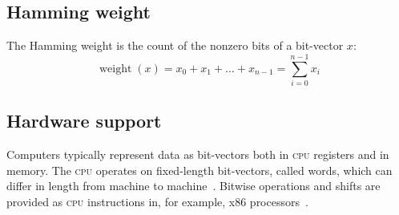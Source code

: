 \documentclass[a4paper,10pt,twoside,openright]{book}
\renewcommand{\sc}[1]{\textsc{\lowercase{#1}}}
\DeclareMathOperator{\weight}{weight}
\begin{document}
\subsection{Hamming weight}
\label{sec:hamming}
The Hamming weight is the count of the nonzero bits of a bit-vector $x$: \[\weight(x) = x_0 + x_1 + \ldots + x_{n-1} = \sum_{i=0}^{n-1}x_i\]
\iffalse
\subsection{Shifts}

For shifts and rotations, the directions \textit{left} and \textit{right} are used in relation to the bit-vector when written as a string, that is, with the least significant bit on the right and the most significant bit on the left.

The left shift operation \sc{SHL} ($\ll$) moves the bits of an $n$-bit bit-vector $x$ to the left by $k$ places, discarding the $k$ leftmost most bits and filling the first $k$ bits with zero: 
\[SHL(x, k) = \twopartdef{0}{i<k}{x_{i-k}} 0 \leq i < n\]

The right shift operation \sc{SHR} ($\gg$) moves bits of a $n$-bit bit-vector $x$ to the right by $k$ places, discarding the $k$ rightmost bits and filling the $k$ leftmost bits with zero: 
\[SHR(x, k) = \twopartdef{x_{i+k}}{i<n-k}{0} 0 \leq i < n\]

\subsection{Rotations}
The left rotation (or \textit{circular shift}) operation \sc{ROTL} ($\lll$) moves the bits of an $n$-bit bit-vector $x$ to the left by $k$ places and introduces the leftmost $k$ bits as the rightmost $k$ bits in the result: 
\[ROTL(x,k) = \twopartdef{x_{n-k+i}}{i<k}{x_{i-k}} 0 \leq i < n \]

The right rotation operation \sc{ROTR} ($\ggg$) moves the bits of an $n$-bit bit-vector $x$ to the right by $k$ places and introduces the rightmost $k$ bits as the leftmost $k$ bits in the result:
\[ROTR(x,k) = \twopartdef{x_{i+k}}{i<n-k}{x_{n-k-i}} 0 \leq i < n \]
\fi
\subsection{Hardware support}
Computers typically represent data as bit-vectors both in \sc{CPU} registers and in memory. The \sc{CPU} operates on fixed-length bit-vectors, called words, which can differ in length from machine to machine~\cite{word}. Bitwise operations and shifts are provided as \sc{CPU} instructions in, for example, x86 processors~\cite{x86}.
\end{document}
